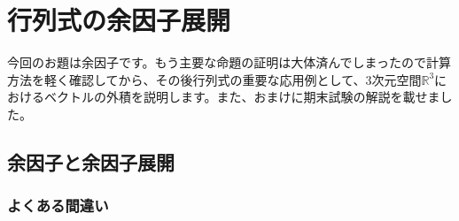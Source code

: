 \chapter{行列式の余因子展開}

今回のお題は余因子です。もう主要な命題の証明は大体済んでしまったので計算方法を軽く確認してから、その後行列式の重要な応用例として、$3$次元空間$\mathbb{R}^3$におけるベクトルの外積を説明します。また、おまけに期末試験の解説を載せました。

\section{余因子と余因子展開}

\subsection{よくある間違い}

